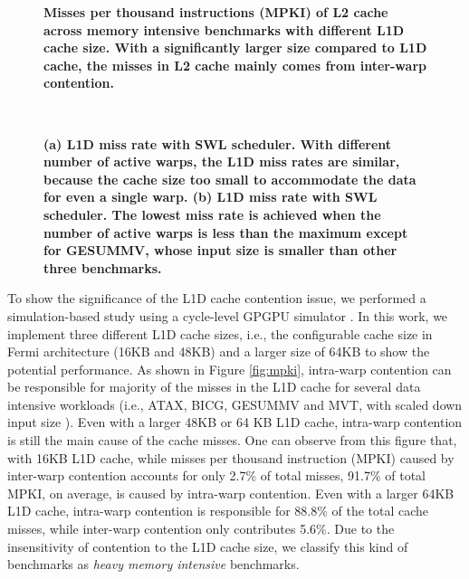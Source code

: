 \documentclass{sigplanconf}
\begin{document}
\begin{figure}
\begin{center}
\end{center}
\vspace{-10pt}
\caption{\textbf{ Misses per thousand instructions (MPKI) of L2 cache across memory intensive benchmarks with different L1D cache size. With a significantly larger size compared to L1D cache, the misses in L2 cache mainly comes from inter-warp contention. \label{fig:l2_mpki}}}
\end{figure}


\begin{figure}
  \begin{center}
    \mbox{
       \quad
      \quad
    }
\end{center}
\vspace{-10pt}
\caption{\textbf{(a) L1D miss rate with SWL scheduler. With different number of active warps, the L1D miss rates are similar, because the cache size too small to accommodate the data for even a single warp. (b) L1D miss rate with SWL scheduler. The lowest miss rate is achieved when the number of active warps is less than the maximum except for GESUMMV, whose input size is smaller than other three benchmarks.}}
\vspace{-15pt}
\end{figure}

To show the significance of the L1D cache contention issue, we performed a simulation-based study using a cycle-level GPGPU simulator \cite{bakhoda2009analyzing}. In this work, we implement three different L1D cache sizes, i.e., the configurable cache size in Fermi architecture (16KB and 48KB) and a larger size of 64KB to show the potential performance. As shown in Figure \ref{fig:mpki}, intra-warp contention can be responsible for majority of the misses in the L1D cache for several data intensive workloads (i.e., ATAX, BICG, GESUMMV and MVT\cite{grauer2012auto}, with scaled down input size \cite{jia2014mrpb}). Even with a larger 48KB or 64 KB L1D cache, intra-warp contention is still the main cause of the cache misses. One can observe from this figure that, with 16KB L1D cache, while misses per thousand instruction (MPKI) caused by inter-warp contention accounts for only 2.7\% of total misses, 91.7\% of total MPKI, on average, is caused by intra-warp contention. Even with a larger 64KB L1D cache, intra-warp contention is responsible for 88.8\% of the total cache misses, while inter-warp contention only contributes 5.6\%. Due to the insensitivity of contention to the L1D cache size, we classify this kind of benchmarks as \textit{heavy memory intensive} benchmarks.
\end{document}
